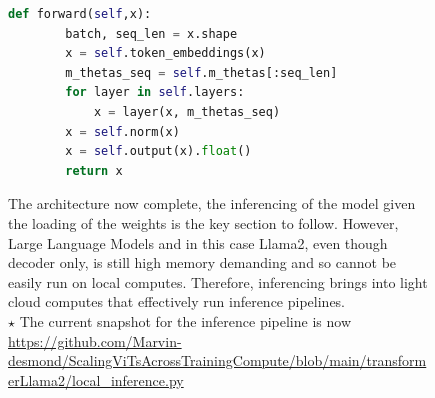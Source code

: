\documentclass[12pt]{article}
\begin{document}
\begin{figure}[!htb]
\begin{minipage}[t]{0.98\textwidth}
\begin{minipage}{0.65\textwidth}
\begin{lstlisting}[language=python,style=python,basicstyle=\ttfamily\footnotesize]
    def forward(self,x):
        batch, seq_len = x.shape
        x = self.token_embeddings(x)
        m_thetas_seq = self.m_thetas[:seq_len]
        for layer in self.layers:
            x = layer(x, m_thetas_seq)
        x = self.norm(x)
        x = self.output(x).float()
        return x 
\end{lstlisting}
\end{minipage}
The architecture now complete, the inferencing of the model given the loading of the weights is 
the key section to follow. However, Large Language Models and in this case Llama2, even though decoder only,
is still high memory demanding and so cannot be easily run on local computes. Therefore, inferencing brings into 
light cloud computes that effectively run inference pipelines.\\
{\footnotesize $\star$ The current snapshot for the inference pipeline is now \url{https://github.com/Marvin-desmond/ScalingViTsAcrossTrainingCompute/blob/main/transformerLlama2/local_inference.py}}
\end{minipage}%
\end{figure}
\pagebreak
\end{document}
